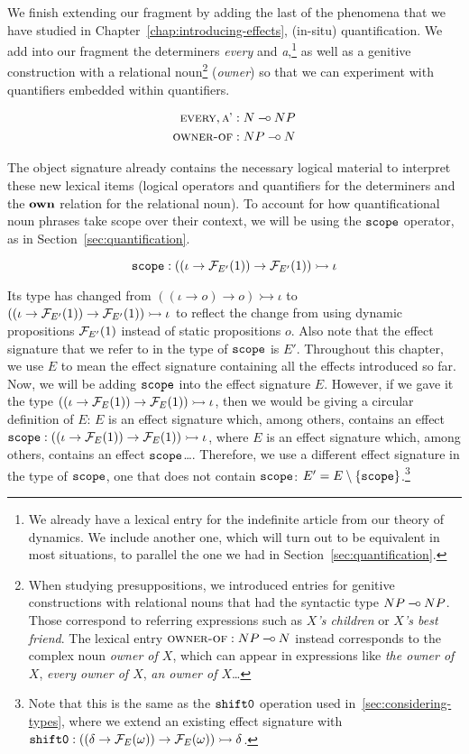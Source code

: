 We finish extending our fragment by adding the last of the phenomena that
we have studied in Chapter~\ref{chap:introducing-effects}, (in-situ)
quantification. We add into our fragment the determiners \emph{every} and
\emph{a},\footnote{We already have a lexical entry for the indefinite
  article from our theory of dynamics. We include another one, which will
  turn out to be equivalent in most situations, to parallel the one we had
  in Section~\ref{sec:quantification}.} as well as a genitive construction
with a relational noun\footnote{When studying presuppositions, we
  introduced entries for genitive constructions with relational nouns that
  had the syntactic type $NP \mathbin{{-}\mkern-3.5mu{\circ}} NP$. Those correspond to referring
  expressions such as \emph{$X$'s children} or \emph{$X$'s best
    friend}. The lexical entry $\textsc{owner-of} : NP \mathbin{{-}\mkern-3.5mu{\circ}} N$ instead
  corresponds to the complex noun \emph{owner of $X$}, which can appear in
  expressions like \emph{the owner of $X$}, \emph{every owner of $X$},
  \emph{an owner of $X$}\ldots} (\emph{owner}) so that we can experiment
with quantifiers embedded within quantifiers.

\begin{align*}
  \textsc{every}, \textsc{a'} &: N \mathbin{{-}\mkern-3.5mu{\circ}} NP \\
  \textsc{owner-of} &: NP \mathbin{{-}\mkern-3.5mu{\circ}} N
\end{align*}

The object signature already contains the necessary logical material to
interpret these new lexical items (logical operators and quantifiers for
the determiners and the $\textbf{own}$ relation for the relational noun). To
account for how quantificational noun phrases take scope over their
context, we will be using the $\mathtt{scope}$ operator, as in
Section~\ref{sec:quantification}.

$$
\mathtt{scope} : ((\iota \to \mathcal{F}_{E'}(1)) \to \mathcal{F}_{E'}(1)) \rightarrowtail \iota
$$

Its type has changed from $((\iota \to o) \to o) \rightarrowtail \iota$ to
$((\iota \to \mathcal{F}_{E'}(1)) \to \mathcal{F}_{E'}(1)) \rightarrowtail \iota$ to
reflect the change from using dynamic propositions $\mathcal{F}_{E'}(1)$ instead of
static propositions $o$. Also note that the effect signature that we refer
to in the type of $\mathtt{scope}$ is $E'$. Throughout this chapter, we use $E$
to mean the effect signature containing all the effects introduced so
far. Now, we will be adding $\mathtt{scope}$ into the effect signature
$E$. However, if we gave it the type
$((\iota \to \mathcal{F}_E(1)) \to \mathcal{F}_E(1)) \rightarrowtail \iota$, then we would
be giving a circular definition of $E$: $E$ is an effect signature which,
among others, contains an effect
$\mathtt{scope} : ((\iota \to \mathcal{F}_E(1)) \to \mathcal{F}_E(1)) \rightarrowtail \iota$, where $E$ is
an effect signature which, among others, contains an effect
$\mathtt{scope}$\ldots. Therefore, we use a different effect signature in the
type of $\mathtt{scope}$, one that does not contain $\mathtt{scope}$:
$E' = E \setminus \{\mathtt{scope}\}$.\footnote{Note that this is the same as
  the $\mathtt{shift0}$ operation used in~\ref{sec:considering-types}, where we
  extend an existing effect signature with
  $\mathtt{shift0} : ((\delta \to \mathcal{F}_E(\omega)) \to
    \mathcal{F}_E(\omega)) \rightarrowtail \delta$.}

